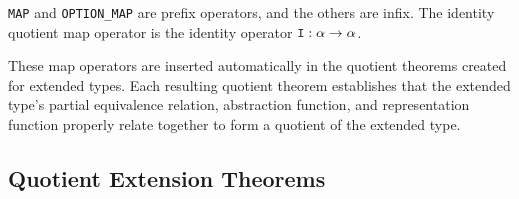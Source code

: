 \documentclass[envcountsame,runningheads]{llncs}
\newcommand{\quotient}{partial equivalence}
\begin{document}
\noindent
{\tt MAP} and {\tt OPTION\_MAP} are prefix operators,
and the others are infix.
The identity quotient map operator is the identity operator
$\mbox{\tt I}:\alpha \rightarrow \alpha$.

These map operators are inserted automatically
in the quotient theorems created
for extended types.
Each resulting quotient theorem establishes that the extended type's
\quotient{} relation,
abstraction function, and representation function properly relate together
to form a quotient of the
extended type.


%
\subsection{Quotient Extension Theorems}
%
\label{condquotients}

%
\end{document}
